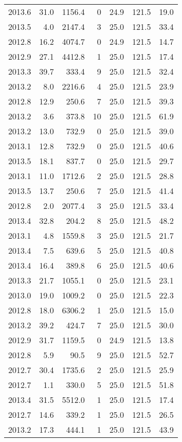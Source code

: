 \begin{tabular}{rrrrrrr}
2013.6 & 31.0 & 1156.4 & 0 & 24.9 & 121.5 & 19.0 \\
2013.5 & 4.0 & 2147.4 & 3 & 25.0 & 121.5 & 33.4 \\
2012.8 & 16.2 & 4074.7 & 0 & 24.9 & 121.5 & 14.7 \\
2012.9 & 27.1 & 4412.8 & 1 & 25.0 & 121.5 & 17.4 \\
2013.3 & 39.7 & 333.4 & 9 & 25.0 & 121.5 & 32.4 \\
2013.2 & 8.0 & 2216.6 & 4 & 25.0 & 121.5 & 23.9 \\
2012.8 & 12.9 & 250.6 & 7 & 25.0 & 121.5 & 39.3 \\
2013.2 & 3.6 & 373.8 & 10 & 25.0 & 121.5 & 61.9 \\
2013.2 & 13.0 & 732.9 & 0 & 25.0 & 121.5 & 39.0 \\
2013.1 & 12.8 & 732.9 & 0 & 25.0 & 121.5 & 40.6 \\
2013.5 & 18.1 & 837.7 & 0 & 25.0 & 121.5 & 29.7 \\
2013.1 & 11.0 & 1712.6 & 2 & 25.0 & 121.5 & 28.8 \\
2013.5 & 13.7 & 250.6 & 7 & 25.0 & 121.5 & 41.4 \\
2012.8 & 2.0 & 2077.4 & 3 & 25.0 & 121.5 & 33.4 \\
2013.4 & 32.8 & 204.2 & 8 & 25.0 & 121.5 & 48.2 \\
2013.1 & 4.8 & 1559.8 & 3 & 25.0 & 121.5 & 21.7 \\
2013.4 & 7.5 & 639.6 & 5 & 25.0 & 121.5 & 40.8 \\
2013.4 & 16.4 & 389.8 & 6 & 25.0 & 121.5 & 40.6 \\
2013.3 & 21.7 & 1055.1 & 0 & 25.0 & 121.5 & 23.1 \\
2013.0 & 19.0 & 1009.2 & 0 & 25.0 & 121.5 & 22.3 \\
2012.8 & 18.0 & 6306.2 & 1 & 25.0 & 121.5 & 15.0 \\
2013.2 & 39.2 & 424.7 & 7 & 25.0 & 121.5 & 30.0 \\
2012.9 & 31.7 & 1159.5 & 0 & 24.9 & 121.5 & 13.8 \\
2012.8 & 5.9 & 90.5 & 9 & 25.0 & 121.5 & 52.7 \\
2012.7 & 30.4 & 1735.6 & 2 & 25.0 & 121.5 & 25.9 \\
2012.7 & 1.1 & 330.0 & 5 & 25.0 & 121.5 & 51.8 \\
2013.4 & 31.5 & 5512.0 & 1 & 25.0 & 121.5 & 17.4 \\
2012.7 & 14.6 & 339.2 & 1 & 25.0 & 121.5 & 26.5 \\
2013.2 & 17.3 & 444.1 & 1 & 25.0 & 121.5 & 43.9 \\

\end{tabular}

